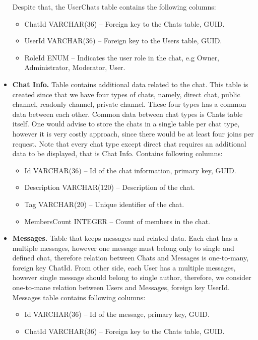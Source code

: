 \begin{itemize}
    Despite that, the UserChats table contains the following columns:
    \begin{itemize}
        \item ChatId VARCHAR(36) -- Foreign key to the Chats table, GUID\@.
        \item UserId VARCHAR(36) -- Foreign key to the Users table, GUID\@.
        \item RoleId ENUM -- Indicates the user role in the chat, e.g Owner, Administrator, Moderator, User.
    \end{itemize}
    \item \textbf{Chat Info.} Table contains additional data related to the chat.
    This table is created since that we have four types of chats, namely, direct chat, public channel,
    readonly channel, private channel.
    These four types has a common data between each other.
    Common data between chat types is Chats table itself.
    One would advise to store the chats in a single table per chat type, however it is very costly approach, since there
    would be at least four joins per request.
    Note that every chat type except direct chat requires an additional data to be displayed, that is Chat Info.
    Contains following columns:
    \begin{itemize}
        \item Id VARCHAR(36) -- Id of the chat information, primary key, GUID\@.
        \item Description VARCHAR(120) -- Description of the chat.
        \item Tag VARCHAR(20) -- Unique identifier of the chat.
        \item MembersCount INTEGER -- Count of members in the chat.
    \end{itemize}
    \item \textbf{Messages.} Table that keeps messages and related data.
    Each chat has a multiple messages, however one message must belong only to single and defined chat,
    therefore relation between Chats and Messages is one-to-many, foreign key ChatId.
    From other side, each User has a multiple messages, however single message should belong to single author,
    therefore, we consider one-to-mane relation between Users and Messages, foreign key UserId.
    Messages table contains following columns:
    \begin{itemize}
        \item Id VARCHAR(36) -- Id of the message, primary key, GUID\@.
        \item ChatId VARCHAR(36) -- Foreign key to the Chats table, GUID\@.

\end{itemize}
\end{itemize}
